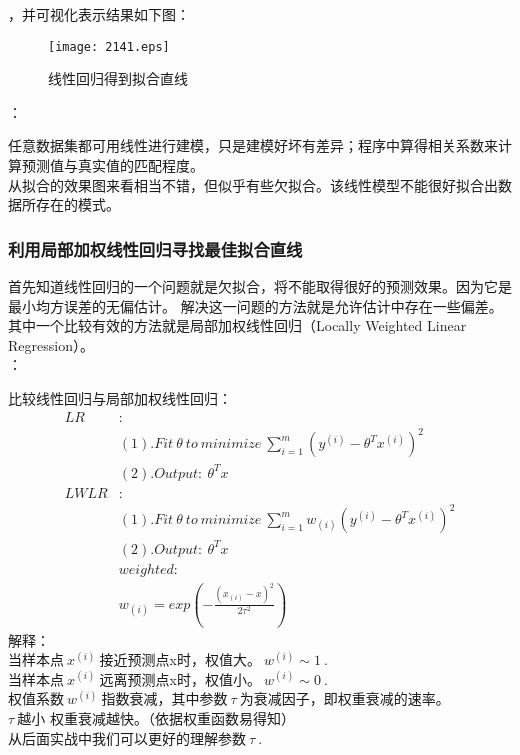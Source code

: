 ，并可视化表示结果如下图：
\begin{figure}[!htb]
  \centering
  \texttt{[image: 2141.eps]}
  \caption{线性回归得到拟合直线}
\end{figure}

：\par
任意数据集都可用线性进行建模，只是建模好坏有差异；程序中算得相关系数来计算预测值与真实值的匹配程度。\\
从拟合的效果图来看相当不错，但似乎有些欠拟合。该线性模型不能很好拟合出数据所存在的模式。

\subsubsection{利用局部加权线性回归寻找最佳拟合直线}
首先知道线性回归的一个问题就是欠拟合，将不能取得很好的预测效果。因为它是最小均方误差的无偏估计。
解决这一问题的方法就是允许估计中存在一些偏差。其中一个比较有效的方法就是局部加权线性回归（Locally Weighted Linear Regression）。\\
：\par
比较线性回归与局部加权线性回归：
\begin{equation}\nonumber
\begin{split}
LR&:\\
   &(1).Fit~\theta~to~minimize~\sum_{i=1}^{m}(y^{(i)}-\theta^Tx^{(i)})^2\\
   &(2).Output:~\theta^Tx\\
LWLR&:\\
   &(1).Fit~\theta~to~minimize~\sum_{i=1}^{m}w_{(i)}(y^{(i)}-\theta^Tx^{(i)})^2\\
   &(2).Output:~\theta^Tx\\
   &weighted:\\
   &w_{(i)}=exp(-\frac{(x_{(i)}-x)^2}{2\tau^2})
\end{split}
\end{equation}
解释：\\
当样本点$~x^{(i)}~$接近预测点x时，权值大。$~w^{(i)}\sim1~$.\\
当样本点$~x^{(i)}~$远离预测点x时，权值小。$~w^{(i)}\sim0~$.\\
权值系数$~w^{(i)}~$指数衰减，其中参数$~\tau~$为衰减因子，即权重衰减的速率。\\
$\tau~$越小 权重衰减越快。（依据权重函数易得知）\\
从后面实战中我们可以更好的理解参数$~\tau~.$ \\
\\

